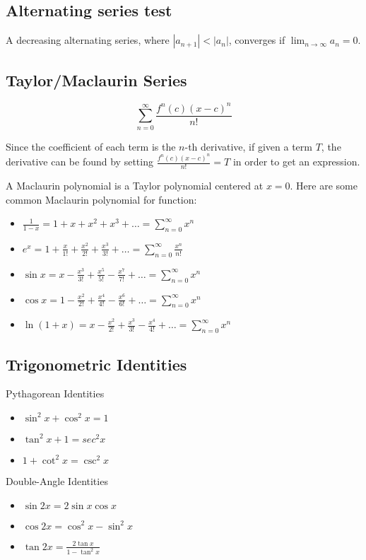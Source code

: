 \subsection{Alternating series test}

A decreasing alternating series, where $|a_{n+1}|<|a_n|$, converges if $\lim_{n\to{\infty}}a_n=0$.

\subsection{Taylor/Maclaurin Series}

\[\sum_{n=0}^{\infty}\frac{f^n(c)(x-c)^n}{n!}\]

Since the coefficient of each term is the $n$-th derivative, if given a term $T$, the derivative can be found by setting $\frac{f^n(c)(x-c)^n}{n!}=T$ in order to get an expression.

\bigskip A Maclaurin polynomial is a Taylor polynomial centered at $x=0$. Here are some common Maclaurin polynomial for function:
\begin{itemize}
    \item $\frac{1}{1-x}=1+x+x^2+x^3+\dots=\sum_{n=0}^{\infty}x^n$
    \item $e^x=1+\frac{x}{1!}+\frac{x^2}{2!}+\frac{x^3}{3!}+\dots=\sum_{n=0}^{\infty}\frac{x^n}{n!}$
    \item $\sin{x}=x-\frac{x^3}{3!}+\frac{x^5}{5!}-\frac{x^7}{7!}+\dots=\sum_{n=0}^{\infty}x^n$
    \item $\cos{x}=1-\frac{x^2}{2!}+\frac{x^4}{4!}-\frac{x^6}{6!}+\dots=\sum_{n=0}^{\infty}x^n$
    \item $\ln(1+x)=x-\frac{x^2}{2!}+\frac{x^3}{3!}-\frac{x^4}{4!}+\dots=\sum_{n=0}^{\infty}x^n$
\end{itemize}

\subsection{Trigonometric Identities}

Pythagorean Identities
\begin{itemize}
    \item $\sin^2{x}+\cos^2{x}=1$
    \item $\tan^2{x}+1=sec^2{x}$
    \item $1+\cot^2{x}=\csc^2{x}$
\end{itemize}\bigskip

Double-Angle Identities
\begin{itemize}
    \item $\sin{2x}=2\sin{x}\cos{x}$
    \item $\cos{2x}=\cos^2{x}-\sin^2{x}$
    \item $\tan{2x}=\frac{2\tan{x}}{1-\tan^2{x}}$
\end{itemize}